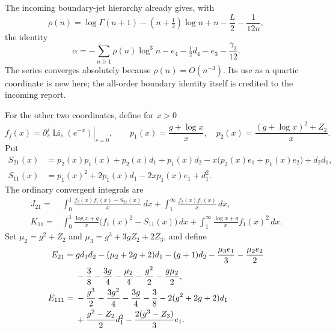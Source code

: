 \documentclass[11pt]{article}
\numberwithin{equation}{section}
\theoremstyle{definition}
\theoremstyle{remark}
\begin{document}
The incoming boundary-jet hierarchy \cite{RepoIndependent} already gives, with
\[
 \rho(n)=\log\Gamma(n+1)-(n+\tfrac12)\log n+n-\frac L2-\frac1{12n},
\]
the identity
\begin{equation}\label{qt:alpha}
 \alpha=-\sum_{n\ge1}\rho(n)\log^3n-e_4-\tfrac12d_4-e_3-\frac{\gamma_3}{12}.
\end{equation}
The series converges absolutely because $\rho(n)=O(n^{-3})$.
Its use as a quartic coordinate is new here; the all-order boundary
identity itself is credited to the incoming report.

For the other two coordinates, define for $x>0$
\[
 f_j(x)=\left.\partial_s^j\operatorname{Li}_s(e^{-x})\right|_{s=0},
 \qquad
 p_1(x)=\frac{g+\log x}{x},\quad
 p_2(x)=\frac{(g+\log x)^2+Z_2}{x}.
\]
Put
\begin{align*}
 S_{21}(x)&=p_2(x)p_1(x)+p_2(x)d_1+p_1(x)d_2
                  -x\bigl(p_2(x)e_1+p_1(x)e_2\bigr)+d_2d_1,\\
 S_{11}(x)&=p_1(x)^2+2p_1(x)d_1-2xp_1(x)e_1+d_1^2.
\end{align*}
The ordinary convergent integrals are
\begin{align}\label{qt:J21}
 J_{21}={}&\int_0^1\frac{f_2(x)f_1(x)-S_{21}(x)}x\,dx
                  +\int_1^\infty\frac{f_2(x)f_1(x)}x\,dx,\\
 K_{11}={}&\int_0^1\frac{\log x+g}{x}
                    \bigl(f_1(x)^2-S_{11}(x)\bigr)\,dx
                  +\int_1^\infty\frac{\log x+g}{x}f_1(x)^2\,dx.
 \label{qt:K11}
\end{align}
Set $\mu_2=g^2+Z_2$ and $\mu_3=g^3+3gZ_2+2Z_3$, and define
\begin{align}\label{qt:constants}
 E_{21}={}&gd_1d_2-(\mu_2+2g+2)d_1-(g+1)d_2
                -\frac{\mu_3e_1}{3}-\frac{\mu_2e_2}{2}\notag\\
 &-\frac38-\frac{3g}{4}-\frac{\mu_2}{4}
                -\frac{g^2}{2}-\frac{g\mu_2}{2},\\
 E_{111}={}&-\frac{g^3}{2}-\frac{3g^2}{4}-\frac{3g}{4}-\frac38
               -2(g^2+2g+2)d_1\notag\\
 &+\frac{g^2-Z_2}{2}d_1^2-\frac{2(g^3-Z_3)}{3}e_1.
\end{align}
\end{document}
